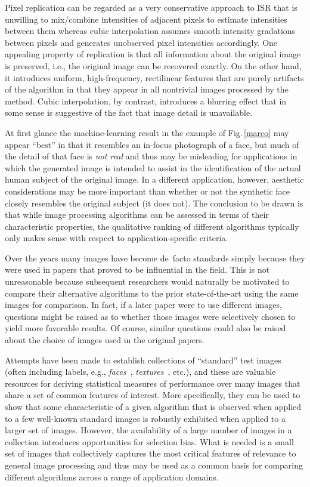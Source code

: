 \documentclass{article}
\begin{document}
Pixel replication can be regarded as a very conservative 
approach to ISR that is unwilling to mix/combine intensities
of adjacent pixels to estimate intensities between them
whereas cubic interpolation assumes smooth intensity
gradations between pixels and generates unobserved
pixel intensities accordingly. One appealing property of
replication is that all information about the original
image is preserved, i.e., the original image can be 
recovered exactly. On the other hand, it introduces
uniform, high-frequency, rectilinear features that are 
purely artifacts of the algorithm in that they appear in 
all nontrivial images processed
by the method. Cubic interpolation, by contrast, 
introduces a blurring effect that in some sense is
suggestive of the fact that image detail is unavailable.

At first glance the machine-learning result in the example
of Fig.\,\ref{marco} may appear
``best'' in that it resembles an in-focus photograph of a
face, but much of the detail of that face is {\em not real} and 
thus may be misleading for applications in which the generated
image is intended to assist in the identification of the 
actual human subject of the original image. In a different application,
however, aesthetic considerations may be more important
than whether or not the synthetic face closely resembles
the original subject (it does not). The conclusion to be drawn is
that while  image processing algorithms can be assessed 
in terms of their characteristic properties, the qualitative 
ranking of different algorithms typically only makes sense with 
respect to application-specific criteria.

Over the years many images have become de~facto 
standards simply because they were used in papers 
that proved to be influential in the field. This is not 
unreasonable because subsequent researchers would naturally
be motivated to compare their alternative algorithms to the
prior state-of-the-art using the same images for comparison. 
In fact, if a
later paper were to use different images, questions
might be raised as to whether those images were selectively
chosen to yield more favorable results. Of course, similar
questions could also be raised about the choice of images
used in the original papers.

Attempts have been made to establish collections of ``standard'' test 
images (often including labels, e.g., {\em faces}~\cite{FERET}, 
{\em textures}~\cite{SIPI}, etc.), 
and these are valuable resources for deriving statistical measures of 
performance over many images that share a set of common features 
of interest. More specifically, they can be used to show that some
characteristic of a given algorithm that is observed when applied to
a few well-known standard images is robustly exhibited when applied
to a larger set of images. However, the availability of a large number of
images in a collection introduces opportunities for selection bias. What is 
needed is a small set of images that collectively captures the most critical
features of relevance to general image processing and thus may
be used as a common basis for comparing different algorithms 
across a range of application domains.
\end{document}
